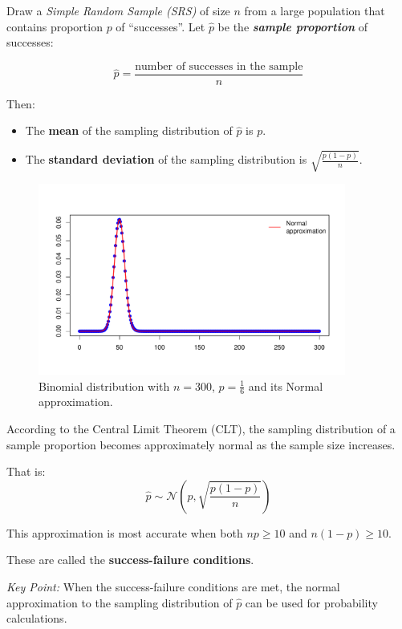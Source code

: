 Draw a \textit{Simple Random Sample (SRS)} of size \( n \) from a large population that contains proportion \( p \) of “successes”. Let \( \hat{p} \) be the \textbf{\textit{sample proportion}} of successes:

\[
\hat{p} = \frac{\text{number of successes in the sample}}{n}
\]

Then:

\begin{itemize}
  \item The \textbf{mean} of the sampling distribution of \( \hat{p} \) is \( p \).
  \item The \textbf{standard deviation} of the sampling distribution is \( \sqrt{ \frac{p(1 - p)}{n} } \).
\end{itemize}


\begin{figure}[h!]
  \centering
  \includegraphics[width=0.9\textwidth]{Section4/binomial_normal.pdf}
  \caption{Binomial distribution with \(n = 300\), \(p = \frac{1}{6}\) and its Normal approximation.}
\end{figure}


According to the Central Limit Theorem (CLT), the sampling distribution of a sample proportion becomes approximately normal as the sample size increases.

That is:
\[
\hat{p} \sim \mathcal{N}\left(p, \sqrt{\frac{p(1 - p)}{n}}\right)
\]

This approximation is most accurate when both \( np \geq 10 \) and \( n(1 - p) \geq 10 \).

These are called the \textbf{success-failure conditions}.

\medskip

\textit{Key Point:} When the success-failure conditions are met, the normal approximation to the sampling distribution of \( \hat{p} \) can be used for probability calculations.
